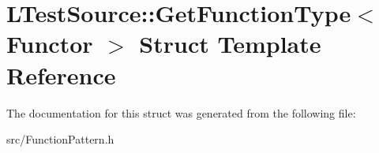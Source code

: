 \hypertarget{struct_l_test_source_1_1_get_function_type}{\section{L\-Test\-Source\-:\-:Get\-Function\-Type$<$ Functor $>$ Struct Template Reference}
\label{struct_l_test_source_1_1_get_function_type}
}


The documentation for this struct was generated from the following file\-:\begin{DoxyCompactItemize}
\item 
src/Function\-Pattern.\-h\end{DoxyCompactItemize}
